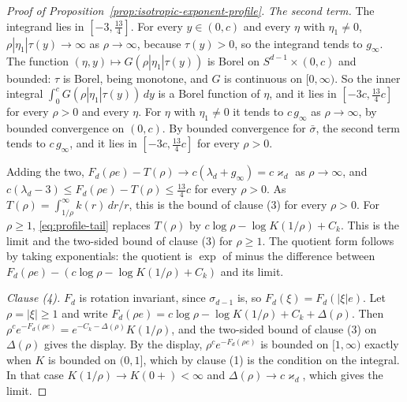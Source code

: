 \begin{proof}[Proof of Proposition~\ref{prop:isotropic-exponent-profile}]
\emph{The second term.} The integrand lies in $[-3, \tfrac{13}{4}]$. For every $y \in (0,c)$ and
every $\eta$ with $\eta_1 \ne 0$, $\rho|\eta_1|\tau(y) \to \infty$ as $\rho \to \infty$, because
$\tau(y) > 0$, so the integrand tends to $g_\infty$. The function
$(\eta,y) \mapsto G(\rho|\eta_1|\tau(y))$ is Borel on $S^{d-1} \times (0,c)$ and bounded: $\tau$
is Borel, being monotone, and $G$ is continuous on $[0,\infty)$. So the inner integral
$\int_0^c G(\rho|\eta_1|\tau(y))\,dy$ is a Borel function of $\eta$, and it lies in
$[-3c, \tfrac{13}{4}c]$ for every $\rho > 0$ and every $\eta$. For $\eta$ with $\eta_1 \ne 0$ it
tends to $c\,g_\infty$ as $\rho \to \infty$, by bounded convergence on $(0,c)$. By bounded
convergence for $\bar\sigma$, the second term tends to $c\,g_\infty$, and it lies in
$[-3c, \tfrac{13}{4}c]$ for every $\rho > 0$.

Adding the two, $F_d(\rho e) - T(\rho) \to c(\lambda_d + g_\infty) = c\varkappa_d$ as
$\rho \to \infty$, and $c(\lambda_d - 3) \le F_d(\rho e) - T(\rho) \le \tfrac{13}{4}c$ for every
$\rho > 0$. As $T(\rho) = \int_{1/\rho}^\infty k(r)\,dr/r$, this is the bound of clause (3) for
every $\rho > 0$. For $\rho \ge 1$, \ref{eq:profile-tail} replaces $T(\rho)$ by
$c\log\rho - \log K(1/\rho) + C_k$. This is the limit and the two-sided bound of clause (3) for
$\rho \ge 1$. The
quotient form follows by taking exponentials: the quotient is $\exp$ of minus the difference
between $F_d(\rho e) - (c\log\rho - \log K(1/\rho) + C_k)$ and its limit.

\emph{Clause (4).} $F_d$ is rotation invariant, since $\sigma_{d-1}$ is, so
$F_d(\xi) = F_d(|\xi|e)$. Let $\rho = |\xi| \ge 1$ and write
$F_d(\rho e) = c\log\rho - \log K(1/\rho) + C_k + \Delta(\rho)$. Then
$\rho^{c}e^{-F_d(\rho e)} = e^{-C_k - \Delta(\rho)}K(1/\rho)$, and the two-sided bound of clause
(3) on $\Delta(\rho)$ gives the display. By the display, $\rho^{c}e^{-F_d(\rho e)}$ is bounded on
$[1,\infty)$ exactly when $K$ is bounded on $(0,1]$, which by clause (1) is the condition on the
integral. In that case $K(1/\rho) \to K(0{+}) < \infty$ and $\Delta(\rho) \to c\varkappa_d$, which
gives the limit.
\end{proof}


